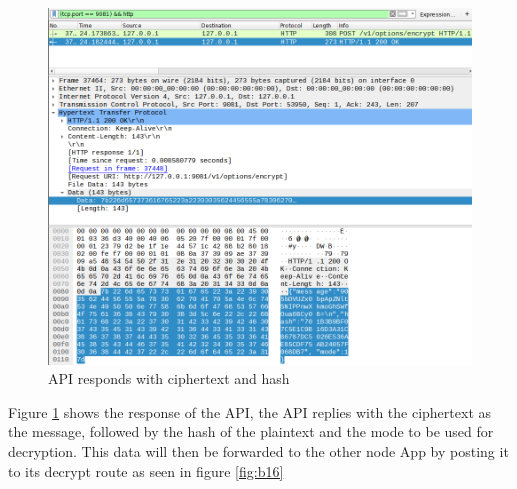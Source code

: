 \begin{figure}[!h]
  \centering
      \includegraphics[width=1\textwidth]{Figures/b12.png}
  \caption[API responds with ciphertext and hash]{API responds with ciphertext and hash}
  \label{fig:b12}
\end{figure}
\FloatBarrier
Figure \ref{fig:b12} shows the response of the API, the API replies with the ciphertext as the message, followed by the hash of the plaintext and the mode to be used for decryption. This data will then be forwarded to the other node App by posting it to its decrypt route as seen in figure \ref{fig:b16}


